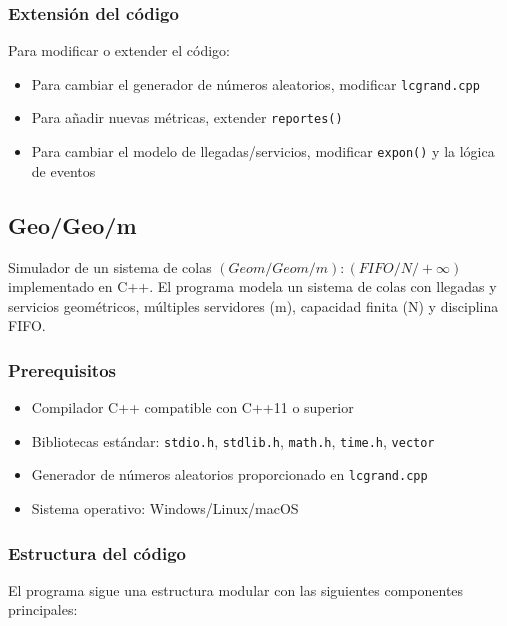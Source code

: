 \documentclass{article}
\begin{document}
\subsubsection{Extensión del código}

Para modificar o extender el código:
\begin{itemize}
    \item Para cambiar el generador de números aleatorios, modificar \texttt{lcgrand.cpp}
    \item Para añadir nuevas métricas, extender \texttt{reportes()}
    \item Para cambiar el modelo de llegadas/servicios, modificar \texttt{expon()} y la lógica de eventos
\end{itemize}

\subsection{Geo/Geo/m}\label{subsec:geogeo_m}

Simulador de un sistema de colas $(Geom/Geom/m):(FIFO/N/+ \infty)$ implementado en C++. El programa modela un sistema de colas con llegadas y servicios geométricos, múltiples servidores (m), capacidad finita (N) y disciplina FIFO.

\subsubsection{Prerequisitos}

\begin{itemize}
    \item Compilador C++ compatible con C++11 o superior
    \item Bibliotecas estándar: \texttt{stdio.h}, \texttt{stdlib.h}, \texttt{math.h}, \texttt{time.h}, \texttt{vector}
    \item Generador de números aleatorios proporcionado en \texttt{lcgrand.cpp}
    \item Sistema operativo: Windows/Linux/macOS
\end{itemize}

\subsubsection{Estructura del código}

El programa sigue una estructura modular con las siguientes componentes principales:
\end{document}
